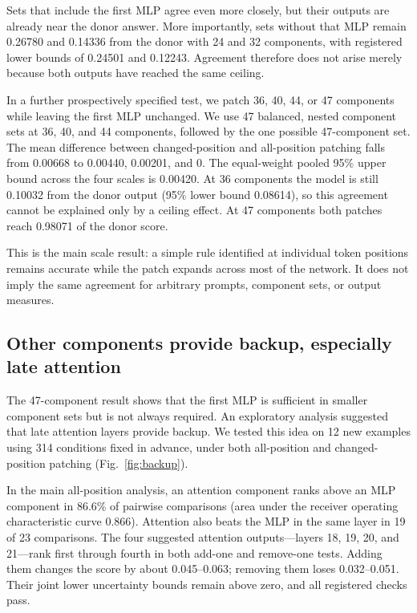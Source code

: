 \documentclass[pdflatex,sn-nature]{sn-jnl}
\begin{document}
Sets that include the first MLP agree even more closely, but their outputs are
already near the donor answer. More importantly, sets without that MLP remain
0.26780 and 0.14336 from the donor with 24 and 32 components, with registered
lower bounds of 0.24501 and 0.12243. Agreement therefore does not arise merely
because both outputs have reached the same ceiling.

In a further prospectively specified test, we patch 36, 40, 44, or 47 components while
leaving the first MLP unchanged. We use 47 balanced, nested component sets at
36, 40, and 44 components, followed by the one possible 47-component set. The
mean difference between changed-position and all-position patching falls from
0.00668 to 0.00440, 0.00201, and 0. The equal-weight pooled 95\% upper bound
across the four scales is 0.00420. At
36 components the model is still 0.10032 from the donor output (95\% lower
bound 0.08614), so this agreement cannot be explained only by a ceiling
effect. At 47 components both patches reach 0.98071 of the donor score.

This is the main scale result: a simple rule identified at individual token
positions remains accurate while the patch expands across most of the
network. It does not imply the same agreement for arbitrary prompts,
component sets, or output measures.

\subsection{Other components provide backup, especially late attention}\label{sec:backup}

The 47-component result shows that the first MLP is sufficient in smaller
component sets but is not always required. An exploratory analysis suggested
that late attention layers provide backup. We tested this idea on 12 new
examples using 314 conditions fixed in advance, under both all-position and
changed-position patching (Fig.~\ref{fig:backup}).

In the main all-position analysis, an attention component ranks above an MLP
component in 86.6\% of pairwise comparisons (area under the receiver operating
characteristic curve 0.866). Attention also beats the MLP in the same layer in
19 of 23 comparisons. The four suggested attention outputs---layers 18, 19,
20, and 21---rank first through fourth in both add-one and remove-one tests.
Adding them changes the score by about 0.045--0.063; removing them loses
0.032--0.051. Their joint lower uncertainty bounds remain above zero, and all
registered checks pass.
\end{document}

